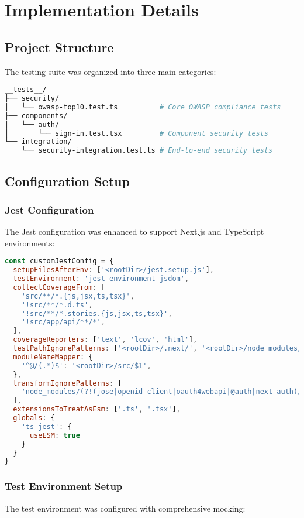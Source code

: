 \documentclass[12pt]{article}
\begin{document}
\section{Implementation Details}

\subsection{Project Structure}
The testing suite was organized into three main categories:

\begin{lstlisting}[language=bash, caption=Test Directory Structure]
__tests__/
├── security/
│   └── owasp-top10.test.ts          # Core OWASP compliance tests
├── components/
│   └── auth/
│       └── sign-in.test.tsx         # Component security tests
└── integration/
    └── security-integration.test.ts # End-to-end security tests
\end{lstlisting}

\subsection{Configuration Setup}

\subsubsection{Jest Configuration}
The Jest configuration was enhanced to support Next.js and TypeScript environments:

\begin{lstlisting}[language=javascript, caption=jest.config.js]
const customJestConfig = {
  setupFilesAfterEnv: ['<rootDir>/jest.setup.js'],
  testEnvironment: 'jest-environment-jsdom',
  collectCoverageFrom: [
    'src/**/*.{js,jsx,ts,tsx}',
    '!src/**/*.d.ts',
    '!src/**/*.stories.{js,jsx,ts,tsx}',
    '!src/app/api/**/*',
  ],
  coverageReporters: ['text', 'lcov', 'html'],
  testPathIgnorePatterns: ['<rootDir>/.next/', '<rootDir>/node_modules/'],
  moduleNameMapper: {
    '^@/(.*)$': '<rootDir>/src/$1',
  },
  transformIgnorePatterns: [
    'node_modules/(?!(jose|openid-client|oauth4webapi|@auth|next-auth)/)'
  ],
  extensionsToTreatAsEsm: ['.ts', '.tsx'],
  globals: {
    'ts-jest': {
      useESM: true
    }
  }
}
\end{lstlisting}

\subsubsection{Test Environment Setup}
The test environment was configured with comprehensive mocking:
\end{document}
